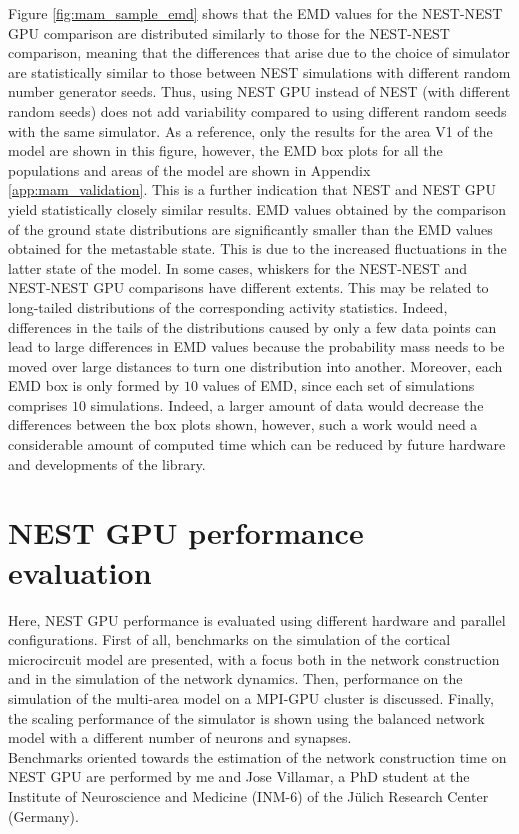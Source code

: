 \documentclass[a4paper, 12pt, twoside, openright]{book}
\begin{document}
Figure \ref{fig:mam_sample_emd} shows that the EMD values for the NEST-NEST GPU comparison are distributed similarly to those for the NEST-NEST comparison, meaning that the differences that arise due to the choice of simulator are statistically similar to those between NEST simulations with different random number generator seeds. Thus, using NEST GPU instead of NEST (with different random seeds) does not add variability compared to using different random seeds with the same simulator. As a reference, only the results for the area V1 of the model are shown in this figure, however, the EMD box plots for all the populations and areas of the model are shown in Appendix \ref{app:mam_validation}. This is a further indication that NEST and NEST GPU yield statistically closely similar results. EMD values obtained by the comparison of the ground state distributions are significantly smaller than the EMD values obtained for the metastable state. This is due to the increased fluctuations in the latter state of the model. In some cases, whiskers for the NEST-NEST and NEST-NEST GPU comparisons have different extents. This may be related to long-tailed distributions of the corresponding activity statistics. Indeed, differences in the tails of the distributions caused by only a few data points can lead to large differences in EMD values because the probability mass needs to be moved over large distances to turn one distribution into another. Moreover, each EMD box is only formed by $10$ values of EMD, since each set of simulations comprises $10$ simulations. Indeed, a larger amount of data would decrease the differences between the box plots shown, however, such a work would need a considerable amount of computed time which can be reduced by future hardware and developments of the library.




\chapter{\textbf{NEST GPU performance evaluation}}
\label{chapter:performance_evaluation}

\begin{tcolorbox}[colback=white,colframe=DarkRed,title=\textbf{Summary}]
Here, NEST GPU performance is evaluated using different hardware and parallel configurations. First of all, benchmarks on the simulation of the cortical microcircuit model are presented, with a focus both in the network construction and in the simulation of the network dynamics. Then, performance on the simulation of the multi-area model on a MPI-GPU cluster is discussed. Finally, the scaling performance of the simulator is shown using the balanced network model with a different number of neurons and synapses.\\
Benchmarks oriented towards the estimation of the network construction time on NEST GPU are performed by me and Jose Villamar, a PhD student at the Institute of Neuroscience and Medicine (INM-6) of the Jülich Research Center (Germany).
\end{tcolorbox}
\end{document}
